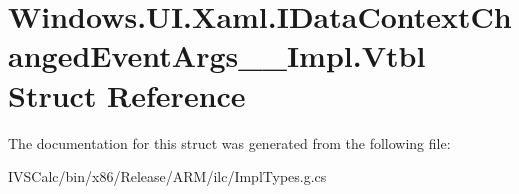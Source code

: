 \hypertarget{struct_windows_1_1_u_i_1_1_xaml_1_1_i_data_context_changed_event_args_____impl_1_1_vtbl}{}\section{Windows.\+U\+I.\+Xaml.\+I\+Data\+Context\+Changed\+Event\+Args\+\_\+\+\_\+\+Impl.\+Vtbl Struct Reference}
\label{struct_windows_1_1_u_i_1_1_xaml_1_1_i_data_context_changed_event_args_____impl_1_1_vtbl}


The documentation for this struct was generated from the following file\+:\begin{DoxyCompactItemize}
\item 
I\+V\+S\+Calc/bin/x86/\+Release/\+A\+R\+M/ilc/Impl\+Types.\+g.\+cs\end{DoxyCompactItemize}
